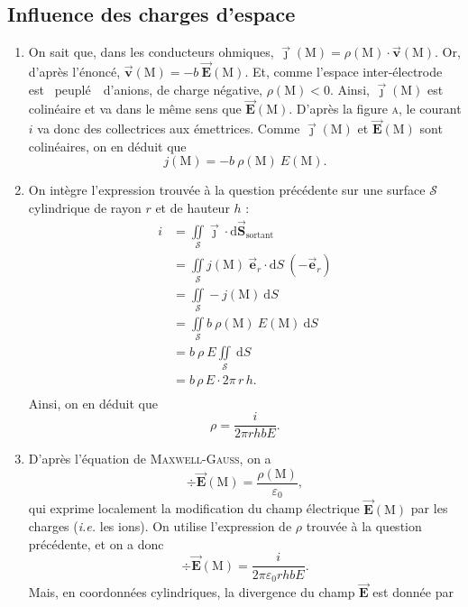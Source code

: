 \documentclass[a4paper, 10pt]{article}
\makeatletter
\let\gguillemotleft\guillemotleft
\let\gguillemotright\guillemotright
\def\guillemotleft{\textsf{\gguillemotleft}}
\def\guillemotright{\textsf{\gguillemotright}}
\let\@vec\vec
\renewcommand{\vec}[1]{\ensuremath{\@vec{\mathbf{#1}}}}
\makeatother
\begin{document}
\begin{multicols}{2}
		\subsection{Influence des charges d'espace}
		\begin{enumerate}
			\item On sait que, dans les conducteurs ohmiques, $\vec{\jmath}(\mathrm{M}) = \rho(\mathrm{M}) \cdot \vec{v}(\mathrm{M})$. Or, d'après l'énoncé, $\vec{v}(\mathrm{M}) = - b\:\vec{E}(\mathrm{M})$. Et, comme l'espace inter-électrode est \guillemotleft~peuplé~\guillemotright\ d'anions, de charge négative, $\rho(\mathrm{M}) < 0$. Ainsi, $\vec{\jmath}(\mathrm{M})$\/ est colinéaire et va dans le même sens que $\vec{E}(\mathrm{M})$. D'après la figure \textsc{a}, le courant $i$\/ va donc des collectrices aux émettrices. Comme $\vec{\jmath}(\mathrm{M})$\/ et $\vec{E}(\mathrm{M})$\/ sont colinéaires, on en déduit que \[
					\boxed{j(\mathrm{M}) = - b\:\rho(\mathrm{M})\:E(\mathrm{M}).}
				\]
			\item On intègre l'expression trouvée à la question précédente sur une surface $\mathcal{S}$\/ cylindrique de rayon $r$\/ et de hauteur $h$\/ :
				\begin{align*}
					i &= \iint\limits_\mathcal{S} \vec{\jmath}\cdot \mathrm{d}\vec{S}_\text{sortant}\\
					&= \iint\limits_\mathcal{S} j(\mathrm{M})\: \vec{e}_r \cdot \mathrm{d}S\: (-\vec{e}_r) \\
					&= \iint\limits_\mathcal{S} -j(\mathrm{M})~\mathrm{d}S \\
					&= \iint\limits_\mathcal{S} b\:\rho(\mathrm{M})\:E(\mathrm{M})~\mathrm{d}S \\
					&= b\:\rho\:E \iint\limits_\mathcal{S}~\mathrm{d}S\\
					&= b\,\rho\,E \cdot 2\pi\,r\,h. \\
				\end{align*}
				Ainsi, on en déduit que \[
					\boxed{\rho = \frac{i}{2\pi rh b E}.}
				\]
			\item D'après l'équation de \textsc{Maxwell-Gauss}, on a \[
					\boxed{\div \vec{E}(\mathrm{M}) = \frac{\rho(\mathrm{M})}{\varepsilon_0},}
				\] qui exprime localement la modification du champ électrique $\vec{E}(\mathrm{M})$\/ par les charges (\textit{i.e.} les ions).
				On utilise l'expression de $\rho$\/ trouvée à la question précédente, et on a donc \[
					\div \vec{E}(\mathrm{M}) = \frac{i}{2\pi\varepsilon_0 r h b E}
				.\] Mais, en coordonnées cylindriques, la divergence du champ $\vec{E}$\/ est donnée par \[
\]
\end{enumerate}
\end{multicols}
\end{document}

